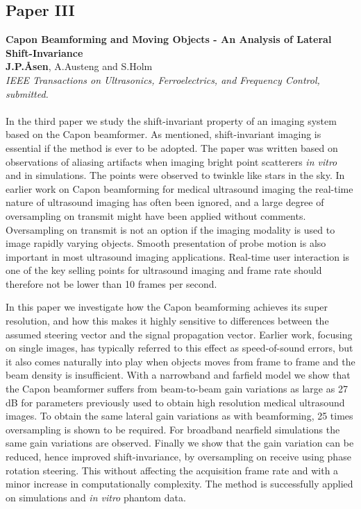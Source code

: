 \subsection{Paper III}
\textbf{Capon Beamforming and Moving Objects - An Analysis of Lateral Shift-Invariance}\\
\textbf{J.\:P.\:\AA{}sen}, A.\:Austeng and S.\:Holm\\
{\it IEEE Transactions on Ultrasonics, Ferroelectrics, and Frequency Control, submitted.}\\\\
In the third paper we study the shift-invariant property of an imaging system based on the Capon beamformer. As mentioned, shift-invariant imaging is essential if the method is ever to be adopted. The paper was written based on observations of aliasing artifacts when imaging bright point scatterers \textit{in vitro} and in simulations. The points were observed to twinkle like stars in the sky. In earlier work on Capon beamforming for medical ultrasound imaging the real-time nature of ultrasound imaging has often been ignored, and a large degree of oversampling on transmit might have been applied without comments. Oversampling on transmit is not an option if the imaging modality is used to image rapidly varying objects. Smooth presentation of probe motion is also important in most ultrasound imaging applications. Real-time user interaction is one of the key selling points for ultrasound imaging and frame rate should therefore not be lower than 10 frames per second.

In this paper we investigate how the Capon beamforming achieves its super resolution, and how this makes it highly sensitive to differences between the assumed steering vector and the signal propagation vector. Earlier work, focusing on single images, has typically referred to this effect as speed-of-sound errors, but it also comes naturally into play when objects moves from frame to frame and the beam density is insufficient. With a narrowband and farfield model we show that the Capon beamformer suffers from beam-to-beam gain variations as large as 27 dB for parameters previously used to obtain high resolution medical ultrasound images.  To obtain the same lateral gain variations as with  beamforming, 25 times oversampling is shown to be required. For broadband nearfield simulations the same gain variations are observed. Finally we show that the gain variation can be reduced, hence improved shift-invariance, by oversampling on receive using phase rotation steering. This without affecting the acquisition frame rate and with a minor increase in computationally complexity. The method is successfully applied on simulations and \textit{in vitro} phantom data.


